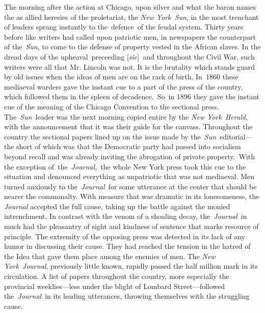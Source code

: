 \documentclass[openany,nobib]{tufte-book}
\begin{document}
The morning after the action at Chicago, upon silver and what the baron
names the as allied heresies of the proletariat, the \emph{New
York~Sun}, in the most trenchant of leaders sprang instantly to
the~defence~of the feudal system. Thirty years before like writers had
called upon patriotic men, in newspapers the counterpart of
the~\emph{Sun}, to come to the defense of property vested in the African
slaves. In the dread days of the upheaval~preceeding
{[}\emph{sic}{]}~and throughout the Civil War, such writers were all
that Mr. Lincoln was not. It is the brutality which stands guard by old
issues when the ideas of men are on the rack of birth. In~1860 these
mediaeval warders gave the instant cue to a part of the press of the
country, which followed them in the spleen of decadence.~So~in 1896 they
gave the instant cue of the meaning of the Chicago Convention to the
sectional press. The~\emph{Sun~}leader was the next morning copied
entire by the \emph{New York}~\emph{Herald}, with the announcement that
it was their guide for the canvass. Throughout the country the sectional
papers lined up on the issue made by the~\emph{Sun}~editorial---the
short of which was that the Democratic party had passed into socialism
beyond recall and was already inviting the abrogation of private
property.~With the exception of~the~\emph{Journal,}~the whole New York
press took this cue to the situation and denounced everything as
unpatriotic that was not mediaeval. Men turned anxiously to
the~\emph{Journal}~for some utterance at the center that should be
nearer the commonalty. With measure that was dramatic in its
lonesomeness, the \emph{Journal} accepted the full cause, taking up the
battle against the monied intrenchment. In contrast with the venom of a
shoaling decay, the~\emph{Journal}~in much had the pleasantry of sight
and kindness of sentence that marks resource of principle. The extremity
of the opposing press was detected in its lack of any humor in
discussing their cause. They had reached the tension in the hatred of
the Idea that gave them place among the enemies of men. The \emph{New
York}~\emph{Journal}, previously little known, rapidly passed the half
million mark in its circulation. A list of papers throughout the
country, more especially the provincial weeklies---less under the blight
of Lombard Street---followed the\emph{~Journal}~in its leading
utterances, throwing themselves with the struggling cause.~
\end{document}
